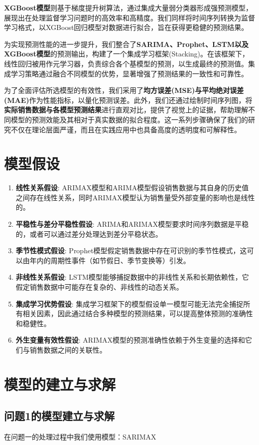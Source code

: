 \documentclass[a4paper]{article}
\begin{document}
\textbf{XGBoost模型}则基于梯度提升树算法，通过集成大量弱分类器形成强预测模型，展现出在处理监督学习问题时的高效率和高精度。我们同样将时间序列转换为监督学习格式，以XGBoost回归模型对数据进行拟合，旨在获得更稳健的预测结果。

为实现预测性能的进一步提升，我们整合了\textbf{SARIMA、Prophet、LSTM以及XGBoost模型}的预测输出，构建了一个集成学习框架(Stacking)。在该框架下，线性回归被用作元学习器，负责综合各个基模型的预测，以生成最终的预测值。集成学习策略通过融合不同模型的优势，显著增强了预测结果的一致性和可靠性。

为了全面评估所选模型的有效性，我们采用了\textbf{均方误差(MSE)与平均绝对误差(MAE)}作为性能指标，以量化预测误差。此外，我们还通过绘制时间序列图，将\textbf{实际销售数据与各模型预测结果}进行直观对比，提供了视觉上的证据，帮助理解不同模型的预测效能及其相对于真实数据的拟合程度。这一系列步骤确保了我们的研究不仅在理论层面严谨，而且在实践应用中也具备高度的透明度和可解释性。
	\section{模型假设}
	
	\begin{enumerate}
		\item \textbf{线性关系假设}: ARIMAX模型和ARIMA模型假设销售数据与其自身的历史值之间存在线性关系，同时ARIMAX模型认为销售量受外部变量的影响也是线性的。
		\item \textbf{平稳性与差分平稳性假设}: ARIMA和ARIMAX模型要求时间序列数据是平稳的，或者可以通过差分处理达到差分平稳状态。
		\item \textbf{季节性模式假设}: Prophet模型假定销售数据中存在可识别的季节性模式，这可以由年内的周期性事件（如节假日、季节变换等）引发。
		\item \textbf{非线性关系假设}: LSTM模型能够捕捉数据中的非线性关系和长期依赖性，它假定销售数据中可能存在复杂的、非线性的动态关系。
		\item \textbf{集成学习优势假设}: 集成学习框架下的模型假设单一模型可能无法完全捕捉所有相关因素，因此通过结合多种模型的预测结果，可以提高整体预测的准确性和稳健性。
		\item \textbf{外生变量有效性假设}: ARIMAX模型的预测准确性依赖于外生变量的选择和它们与销售数据之间的关联性。
	\end{enumerate}

	\section{模型的建立与求解}  
	\subsection{问题1的模型建立与求解}
	在问题一的处理过程中我们使用模型：SARIMAX
\end{document}
